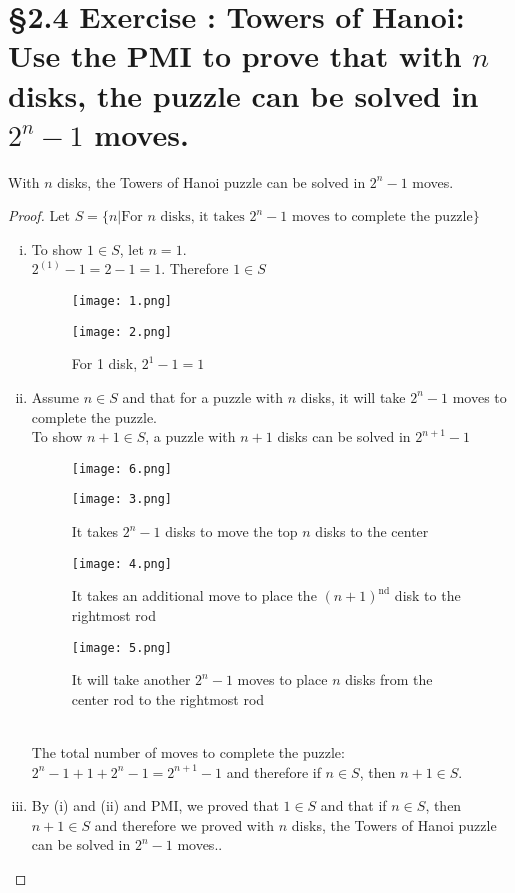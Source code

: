 \documentclass[a4paper,11pt]{article}
\begin{document}
\newpage

\setcounter{ProblemCounter}{11}
\section*{\S 2.4 Exercise : Towers of Hanoi: Use the PMI to prove that with \(n\) disks, the puzzle can be solved in \(2^n-1\) moves.}

\begin{theorem1}
With \(n\) disks, the Towers of Hanoi puzzle can be solved in \(2^n-1\) moves.
\begin{proof}
  Let \(S = \{n | \text{For } n \text{ disks, it takes } 2^n-1 \text{ moves to complete the puzzle}\}\)
    \begin{enumerate}[(i)]
  \item To show \(1 \in S\), let \(n=1\).\\
  \(2^{(1)}-1 = 2 - 1 = 1\). Therefore \(1 \in S\)
  \begin{figure}
  [htbp]
\centering
\texttt{[image: 1.png]}
\caption*{}
\label{fig:1}
\end{figure}
\begin{figure}[htbp]
\centering
\texttt{[image: 2.png]}
\caption*{For 1 disk, \(2^1-1 = 1\)}
\label{fig:2}
\end{figure}
\newpage
 \item Assume \(n \in S\) and that for a puzzle with \(n\) disks, it will take \(2^n-1\) 
 moves to complete the puzzle.\\
 To show \(n+1 \in S\), a puzzle with \(n+1\) disks can be solved in \(2^{n+1}-1\)
\begin{figure}[h!]
\centering
\texttt{[image: 6.png]}
\label{fig:6}
\end{figure}
\begin{figure}[h!]
\centering
\texttt{[image: 3.png]}
\caption*{It takes \(2^n-1\) disks to move the top \(n\) disks to the center}
\label{fig:3}
\end{figure}
\begin{figure}[h!]
\centering
\texttt{[image: 4.png]}
\caption*{It takes an additional move to place the \({(n+1)}^{\text{nd}}\) disk to the rightmost rod}
\label{fig:4}
\end{figure}
\begin{figure}[h!]
\centering
\texttt{[image: 5.png]}
\caption*{It will take another \(2^n-1\) moves to place \(n\) disks from the center rod to the rightmost rod}
\label{fig:5}
\end{figure}
\\The total number of moves to complete the puzzle:\\
\(2^{n}-1+1+2^{n}-1 = 2^{n+1} - 1\) and therefore if \(n \in S\), then \(n+1 \in 
S\).
\item By {(i)} and {(ii)} and PMI, we proved that \(1 \in S\) and that if \(n \in 
S\), then \(n+1 \in S\) and therefore we proved with \(n\) disks, the Towers of Hanoi puzzle can be solved in \(2^n-1\) 
moves..
\end{enumerate}
\end{proof}  
\end{theorem1}
\end{document}
